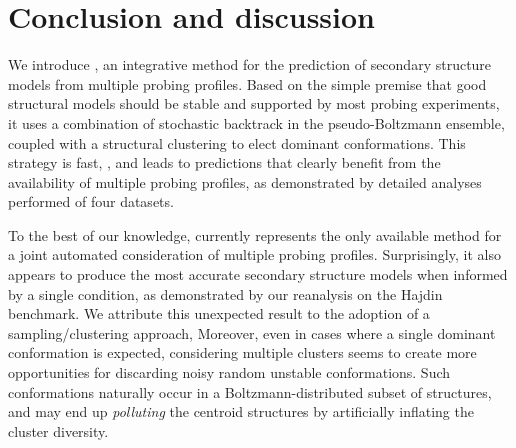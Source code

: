 \documentclass[a4,center,fleqn]{NAR}
\begin{document}









\section*{Conclusion and discussion}

We introduce \OurTool{}, an integrative method for the prediction of secondary structure models from multiple probing profiles. Based on the simple premise that good structural models should be  stable and supported by most probing experiments, it uses a combination of stochastic backtrack in the pseudo-Boltzmann ensemble, coupled with a structural clustering to elect dominant conformations. This strategy is fast, , and leads to predictions that clearly benefit from the availability of multiple probing profiles, as demonstrated by detailed analyses performed of four datasets. 


To the best of our knowledge, \OurTool currently represents the only available method for a joint automated consideration of multiple probing profiles. Surprisingly, it also appears to produce the most accurate secondary structure models when informed by a single condition, as demonstrated by our reanalysis on the Hajdin\etal\cite{Hajdin2013} benchmark. We attribute this unexpected result to the adoption of a sampling/clustering approach, 
Moreover, even in cases where a single dominant conformation is expected, considering multiple clusters seems to create more opportunities for discarding noisy random unstable conformations. Such conformations naturally occur in a Boltzmann-distributed subset of structures, and may end up \emph{polluting} the centroid structures by artificially inflating the cluster diversity. 
\end{document}
